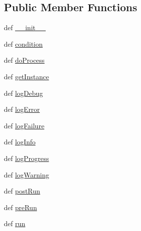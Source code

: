 \subsection*{\-Public \-Member \-Functions}
\begin{DoxyCompactItemize}
\item 
def \hyperlink{classassetQC_1_1api_1_1validator_1_1Validator_a34b22abaca2b8720b2ffd0f188103266}{\-\_\-\-\_\-init\-\_\-\-\_\-}
\item 
def \hyperlink{classassetQC_1_1api_1_1validator_1_1Validator_a015e68050f01248dda0f7e6c14c3f5df}{condition}
\item 
def \hyperlink{classassetQC_1_1api_1_1validator_1_1Validator_af932ad090b453d9cc86b706ca7e774fd}{do\-Process}
\item 
def \hyperlink{classassetQC_1_1api_1_1validator_1_1Validator_a102fd81a70cbd5aa37b6cd4209338b4d}{get\-Instance}
\item 
def \hyperlink{classassetQC_1_1api_1_1validator_1_1Validator_a4180f7fe5d574f79b885f7c9195540b2}{log\-Debug}
\item 
def \hyperlink{classassetQC_1_1api_1_1validator_1_1Validator_ab47018536161ed0db2e60a1db79786cf}{log\-Error}
\item 
def \hyperlink{classassetQC_1_1api_1_1validator_1_1Validator_abcb93577c7c79d4e7a9bb706eabdb1ef}{log\-Failure}
\item 
def \hyperlink{classassetQC_1_1api_1_1validator_1_1Validator_a4827441bccd6d74ba6d1013a472b84c9}{log\-Info}
\item 
def \hyperlink{classassetQC_1_1api_1_1validator_1_1Validator_aab196346fdff23f2744c3428ed0d9d8e}{log\-Progress}
\item 
def \hyperlink{classassetQC_1_1api_1_1validator_1_1Validator_a14221ed3bdf6d078b20c6878b874a11c}{log\-Warning}
\item 
def \hyperlink{classassetQC_1_1api_1_1validator_1_1Validator_a04020b89e4e8f831a7c834628d49f610}{post\-Run}
\item 
def \hyperlink{classassetQC_1_1api_1_1validator_1_1Validator_ae65be72e8dbb2e0f66665665fa27ea73}{pre\-Run}
\item 
def \hyperlink{classassetQC_1_1api_1_1validator_1_1Validator_aa012294843cbc417ac4f9974f64f25e9}{run}
\end{DoxyCompactItemize}

